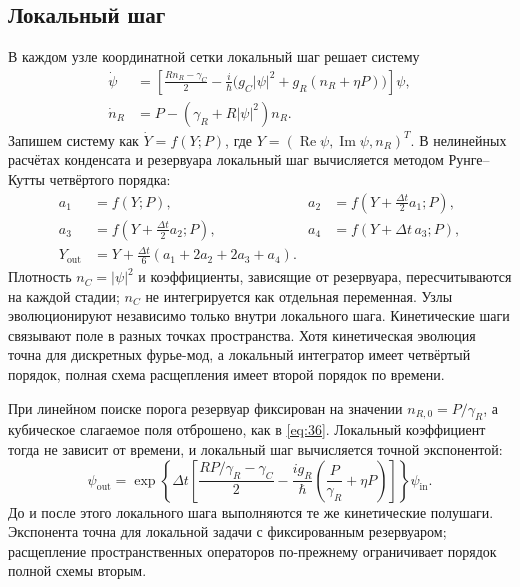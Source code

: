 \documentclass[12pt,a4paper]{article}
\begin{document}
\subsection{Локальный шаг}\label{sec:B.3}
В каждом узле координатной сетки локальный шаг решает систему
\begin{equation}
\begin{aligned}
\dot\psi&=\left[\frac{Rn_R-\gamma_C}{2}
-\frac{i}{\hbar}\bigl(g_C|\psi|^2+g_R(n_R+\eta P)\bigr)\right]\psi,\\
\dot n_R&=P-(\gamma_R+R|\psi|^2)n_R.
\end{aligned}\label{eq:B.local}
\end{equation}
Запишем систему как \(\dot Y=f(Y;P)\), где
\(Y=(\operatorname{Re}\psi,\operatorname{Im}\psi,n_R)^T\).
В нелинейных расчётах конденсата и резервуара локальный шаг вычисляется методом Рунге--Кутты четвёртого порядка:
\begin{equation}
\begin{aligned}
a_1&=f(Y;P),& a_2&=f(Y+\tfrac{\Delta t}{2}a_1;P),\\
a_3&=f(Y+\tfrac{\Delta t}{2}a_2;P),& a_4&=f(Y+\Delta t\,a_3;P),\\
Y_{\mathrm{out}}&=Y+\frac{\Delta t}{6}(a_1+2a_2+2a_3+a_4).
\end{aligned}\label{eq:B.rk4}
\end{equation}
Плотность \(n_C=|\psi|^2\) и коэффициенты, зависящие от резервуара, пересчитываются на каждой стадии; \(n_C\) не интегрируется как отдельная переменная. Узлы эволюционируют независимо только внутри локального шага. Кинетические шаги связывают поле в разных точках пространства. Хотя кинетическая эволюция точна для дискретных фурье-мод, а локальный интегратор имеет четвёртый порядок, полная схема расщепления имеет второй порядок по времени.


При линейном поиске порога резервуар фиксирован на значении
\(n_{R,0}=P/\gamma_R\), а кубическое слагаемое поля отброшено, как в \eqref{eq:36}. Локальный коэффициент тогда не зависит от времени, и локальный шаг вычисляется точной экспонентой:
\begin{equation}\label{eq:B.linear-local}
\psi_{\mathrm{out}}=\exp\!\left\{\Delta t\left[
\frac{RP/\gamma_R-\gamma_C}{2}
-\frac{i g_R}{\hbar}\left(\frac{P}{\gamma_R}+\eta P\right)
\right]\right\}\psi_{\mathrm{in}}.
\end{equation}
До и после этого локального шага выполняются те же кинетические полушаги. Экспонента точна для локальной задачи с фиксированным резервуаром; расщепление пространственных операторов по-прежнему ограничивает порядок полной схемы вторым.
\end{document}
